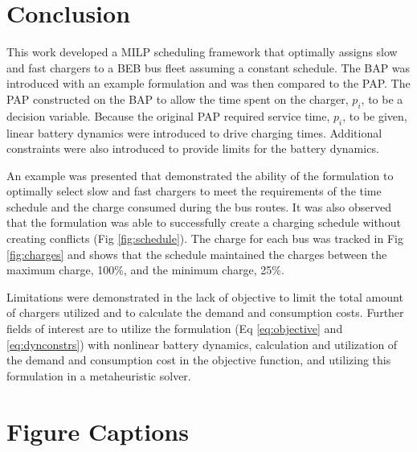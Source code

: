 \documentclass[utf8]{FrontiersinHarvard}
\begin{document}
\section{Conclusion}
\label{sec:conclusion}
This work developed a MILP scheduling framework that optimally assigns slow and fast chargers to a BEB bus fleet
assuming a constant schedule. The BAP was introduced with an example formulation and was then compared to the PAP. The
PAP constructed on the BAP to allow the time spent on the charger, $p_i$, to be a decision variable. Because the
original PAP required service time, $p_i$, to be given, linear battery dynamics were introduced to drive charging times.
Additional constraints were also introduced to provide limits for the battery dynamics.

An example was presented that demonstrated the ability of the formulation to optimally select slow and fast chargers to
meet the requirements of the time schedule and the charge consumed during the bus routes. It was also observed that the
formulation was able to successfully create a charging schedule without creating conflicts (Fig \ref{fig:schedule}). The
charge for each bus was tracked in Fig \ref{fig:charges} and shows that the schedule maintained the charges between the
maximum charge, 100\%, and the minimum charge, 25\%.

Limitations were demonstrated in the lack of objective to limit the total amount of chargers utilized and to calculate
the demand and consumption costs. Further fields of interest are to utilize the formulation (Eq \eqref{eq:objective} and
\eqref{eq:dynconstrs}) with nonlinear battery dynamics, calculation and utilization of the demand and consumption cost
in the objective function, and utilizing this formulation in a metaheuristic solver.

%




\newpage
\section*{Figure Captions}


\end{document}
